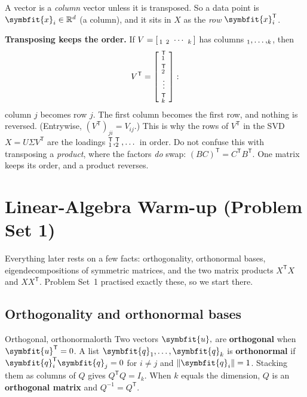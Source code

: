 \documentclass[11pt]{article}
\newcommand{\bm}[1]{\symbfit{#1}}
\newcommand{\R}{\mathbb{R}}
\newcommand{\vx}{\bm{x}}
\let\vv\relax\newcommand{\vv}{\bm{v}}
\newcommand{\vu}{\bm{u}}
\newcommand{\vq}{\bm{q}}
\newcommand{\T}{^{\mathsf T}}
\newcommand{\norm}[1]{\left\lVert #1\right\rVert}
\begin{document}
A vector is a \emph{column} vector unless it is transposed. So a data point is
$\vx_i\in\R^{d}$ (a column), and it sits in $X$ as the \emph{row} $\vx_i\T$.

\begin{careful}
\textbf{Transposing keeps the order.} If $V=[\,\vv_1\ \vv_2\ \cdots\ \vv_k\,]$ has columns $\vv_1,\dots,\vv_k$, then
\[
V\T=\begin{bmatrix}\ \vv_1\T\ \\[4pt] \ \vv_2\T\ \\[2pt] \vdots\\[2pt] \ \vv_k\T\ \end{bmatrix}:
\]
column $j$ becomes row $j$. The first column becomes the first row, and nothing is reversed. (Entrywise,
$(V\T)_{ji}=V_{ij}$.) This is why the rows of $V\T$ in the SVD $X=U\Sigma V\T$ are the loadings
$\vv_1\T,\vv_2\T,\dots$ in order. Do not confuse this with transposing a \emph{product}, where the factors
\emph{do} swap: $(BC)\T=C\T B\T$. One matrix keeps its order, and a product reverses.
\end{careful}

\section{Linear-Algebra Warm-up (Problem Set 1)}

Everything later rests on a few facts: orthogonality, orthonormal bases,
eigendecompositions of symmetric matrices, and the two matrix products $X\T X$ and
$XX\T$. Problem Set~1 practised exactly these, so we start there.

\subsection{Orthogonality and orthonormal bases}

\begin{definition}{Orthogonal, orthonormal}{orth}
Two vectors $\vu,\vv$ are \textbf{orthogonal} when $\vu\T\vv=0$. A list
$\vq_1,\dots,\vq_k$ is \textbf{orthonormal} if $\vq_i\T\vq_j=0$ for $i\ne j$ and
$\norm{\vq_i}=1$. Stacking them as columns of $Q$ gives $Q\T Q=I_k$. When $k$ equals
the dimension, $Q$ is an \textbf{orthogonal matrix} and $Q^{-1}=Q\T$.
\end{definition}
\end{document}
